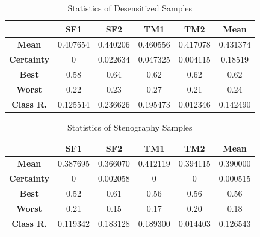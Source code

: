 \documentclass[journal]{IEEEtran} %
\begin{document}
\begin{CJK*}{UTF8}{gbsn}
\begin{table}[htbp]
    \centering
    \caption{Statistics of Desensitized Samples}
    \begin{tabular}{|c|c|c|c|c|c|}
        \hline
        & \textbf{SF1} & \textbf{SF2} & \textbf{TM1} & \textbf{TM2} & \textbf{Mean} \\
        \hline
        \textbf{Mean} & 0.407654 & 0.440206 & 0.460556 & 0.417078 & 0.431374 \\
        \hline
        \textbf{Certainty} & 0 & 0.022634 & 0.047325 & 0.004115 & 0.18519 \\
        \hline
        \textbf{Best} & 0.58 & 0.64 & 0.62 & 0.62 & 0.62 \\
        \hline
        \textbf{Worst} & 0.22 & 0.23 & 0.27 & 0.21 & 0.24 \\
        \hline
        \textbf{Class R.} & 0.125514 & 0.236626 & 0.195473 & 0.012346 & 0.142490 \\
        \hline
    \end{tabular}
    \label{tab:st_des}
\end{table}

\begin{table}[htbp]
    \centering
    \caption{Statistics of Stenography Samples}
    \begin{tabular}{|c|c|c|c|c|c|}
        \hline
        & \textbf{SF1} & \textbf{SF2} & \textbf{TM1} & \textbf{TM2} & \textbf{Mean} \\
        \hline
        \textbf{Mean} & 0.387695 & 0.366070 & 0.412119 & 0.394115 & 0.390000 \\
        \hline
        \textbf{Certainty} & 0 & 0.002058 & 0 & 0 & 0.000515 \\
        \hline
        \textbf{Best} & 0.52 & 0.61 & 0.56 & 0.56 & 0.56 \\
        \hline
        \textbf{Worst} & 0.21 & 0.15 & 0.17 & 0.20 & 0.18 \\
        \hline
        \textbf{Class R.} & 0.119342 & 0.183128 & 0.189300 & 0.014403 & 0.126543 \\
        \hline
    \end{tabular}
    \label{tab:st_msg}
\end{table}


\end{CJK*}
\end{document}
